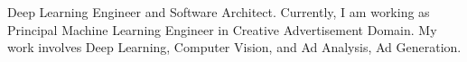 \par{
	Deep  Learning Engineer and Software Architect. Currently, I am working as Principal Machine Learning Engineer in Creative Advertisement Domain. My work involves Deep Learning, Computer Vision, and Ad Analysis, Ad Generation. 
}